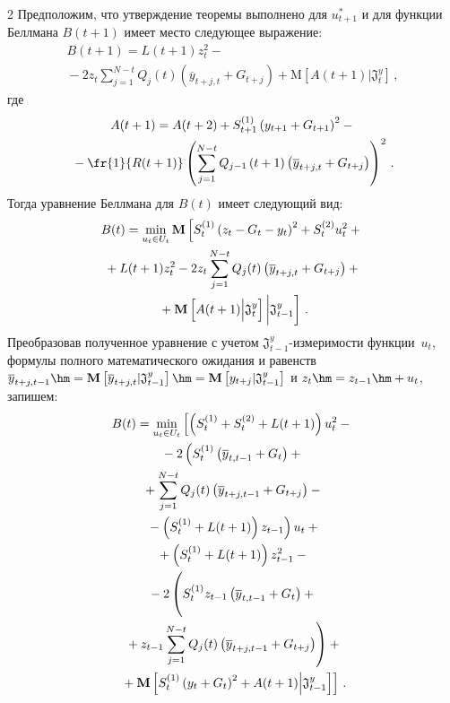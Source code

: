 \begin{multicols}{2}
  Предположим, что утверждение теоремы выполнено для $u^*_{t+1}$ и для функции 
Беллмана $B(t+1)$ имеет место следующее выражение:
  \begin{multline*}
  B(t+1) = L(t+1) z_t^2 -{}\\
{}-2z_t\sum\limits_{j=1}^{N-t} Q_j(t) \left( 
\overline{y}_{t+j,t}+G_{t+j}\right) +\mathrm{M}\left[ A(t+1)\vert \mathfrak{J}^y_t\right]\,,
\end{multline*}
где
\begin{multline*}
A(t+1) = A(t+2) +S_{t+1}^{(1)}\left( y_{t+1} +G_{t+1}\right)^2 -{}\\
{}-\fr{1}{R(t+1)}\left( 
\sum\limits_{j=1}^{N-t} Q_{j-1}\left(t+1\right)\left( \overline{y}_{t+j,t}+G_{t+j}\right) 
\right)^2\,.
  \end{multline*}
  Тогда уравнение Беллмана для $B(t)$ имеет сле\-ду\-ющий вид:
  \begin{multline*}
  B(t) = \min\limits_{u_t\in U_t} \mathbf{M}\left[ S_t^{(1)}\left( z_t-G_t-y_t\right)^2+
  S_t^{(2)} u_t^2+{}\right.\\
{}+L(t+1)z_t^2- 2z_t\sum\limits_{j=1}^{N-t} Q_j(t)\left( 
\overline{y}_{t+j,t}+G_{t+j}\right) +{}\\
  \left.{}+ \mathbf{M} \left[ A(t+1)\Big\vert \mathfrak{J}^y_t\right]\bigg \vert \mathfrak{J}^y_{t-1}
\vphantom{S_t^{(1)}\left( z_t-G_t-y_t\right)^2}\right]\,.
  \end{multline*}
    Преобразовав полученное уравнение с учетом $\mathfrak{J}^y_{t-1}$-из\-ме\-ри\-мости 
функции~$u_t$, формулы полного математического ожидания и равенств 
$\overline{y}_{t+j,t-1}\hm= \mathbf{M}\left[ \overline{y}_{t+j,t}\vert \mathfrak{J}^y_{t-
1}\right] \hm= \mathbf{M}\left[ y_{t+j}\vert \mathfrak{J}^y_{t-1}\right]$ и $z_t\hm= z_{t-
1}\hm+u_t$, запишем:
  \begin{multline*}
  B(t) =\min\limits_{u_t\in U_t}\left[ 
  \left( S_t^{(1)} +S_t^{(2)} +L(t+1)\right)u_t^2-{}\right.\\
  {}-
  2\left( S_t^{(1)} \left( \overline{y}_{t,t-1}+G_t\right) +{}\right.\\
   {}+\sum\limits_{j=1}^{N-t} Q_j(t)\left( 
\overline{y}_{t+j,t-1}+G_{t+j}\right) -{}\\
\left.{}-\left(
  S_t^{(1)}+L(t+1)\right)z_{t-1}\right) u_t+{}\\
 {}+
  \left( S_t^{(1)}+L(t+1)\right) z^2_{t-1} -{}\\
  {}-
  2\left( \vphantom{\sum\limits^{N-t}_{j=1}}
  S_t^{(1)} z_{t-1}\left( \overline{y}_{t,t-1}+G_t\right)+{}\right.\\
 \left.{}+
  z_{t-1}\sum\limits^{N-t}_{j=1} Q_j(t) \left( \overline{y}_{t+j,t-1}+G_{t+j}\right)\right) +{}\\
\left.  {}+
  \mathbf{M}\left[ S_t^{(1)}\left( y_t+G_t\right)^2+A(t+1)\Big\vert \mathfrak{J}^y_{t-
1}\right]\right]\,.
  \end{multline*}


\end{multicols}
